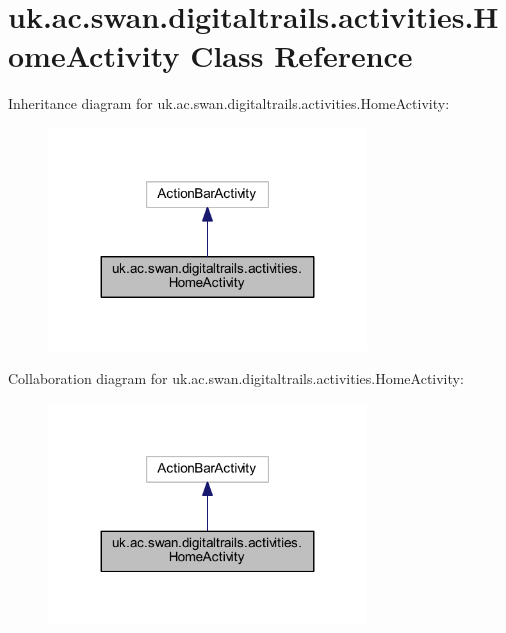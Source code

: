 \hypertarget{classuk_1_1ac_1_1swan_1_1digitaltrails_1_1activities_1_1_home_activity}{\section{uk.\+ac.\+swan.\+digitaltrails.\+activities.\+Home\+Activity Class Reference}
\label{classuk_1_1ac_1_1swan_1_1digitaltrails_1_1activities_1_1_home_activity}
}


Inheritance diagram for uk.\+ac.\+swan.\+digitaltrails.\+activities.\+Home\+Activity\+:\nopagebreak
\begin{figure}[H]
\begin{center}
\leavevmode
\includegraphics[width=239pt]{classuk_1_1ac_1_1swan_1_1digitaltrails_1_1activities_1_1_home_activity__inherit__graph}
\end{center}
\end{figure}


Collaboration diagram for uk.\+ac.\+swan.\+digitaltrails.\+activities.\+Home\+Activity\+:\nopagebreak
\begin{figure}[H]
\begin{center}
\leavevmode
\includegraphics[width=239pt]{classuk_1_1ac_1_1swan_1_1digitaltrails_1_1activities_1_1_home_activity__coll__graph}
\end{center}
\end{figure}
